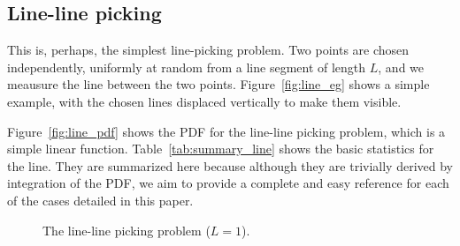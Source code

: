 \subsection{Line-line picking}
\label{sec:line_line}

This is, perhaps, the simplest line-picking problem. Two points are
chosen independently, uniformly at random from a line segment of
length $L$, and we meausure the line between the two
points. Figure~\ref{fig:line_eg} shows a simple example, with the
chosen lines displaced vertically to make them visible.

Figure~\ref{fig:line_pdf} shows the PDF for the line-line
picking problem, which is a simple linear
function. Table~\ref{tab:summary_line} shows the basic statistics for
the line. They are summarized here because although they are trivially
derived by integration of the PDF, we aim to provide a complete and
easy reference for each of the cases detailed in this paper.

\begin{figure}[htbp]
  \begin{center}
       \hspace{0.04\columnwidth}
    \caption{The line-line picking problem ($L=1$).}
  \end{center}
\vspace{-4mm}
\end{figure}

